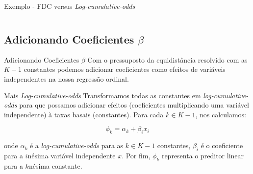 \begin{frame}{Exemplo - FDC versus \textit{Log-cumulative-odds}}
	\begin{columns}
		\begin{column}{0.5\textwidth}
			\centering
		\end{column}
		\begin{column}{0.5\textwidth}
			\centering
		\end{column}
	\end{columns}
\end{frame}

\subsection{Adicionando Coeficientes $\beta$}
\begin{frame}{Adicionando Coeficientes $\beta$}
	Com o pressuposto da equidistância resolvido com as $K-1$ constantes
	podemos adicionar coeficientes como efeitos de variáveis independentes
	na nossa regressão ordinal.
\end{frame}

\begin{frame}{Mais \textit{Log-cumulative-odds}}
	Transformamos todas as constantes em \textit{log-cumulative-odds} para
	que possamos adicionar efeitos (coeficientes multiplicando uma variável
	independente) à taxas basais (constantes).
	\vfill
	Para cada $k \in K-1$, nos calculamos:

	$$\phi_k = \alpha_k + \beta_i x_i$$

	onde $\alpha_k$ é a \textit{log-cumulative-odds} para as $k \in K-1$ constantes,
	$\beta_i$ é o coeficiente para a $i$nésima variável independente $x$.
	\vfill
	Por fim, $\phi_k$ representa o preditor linear para a $k$nésima constante.
\end{frame}

